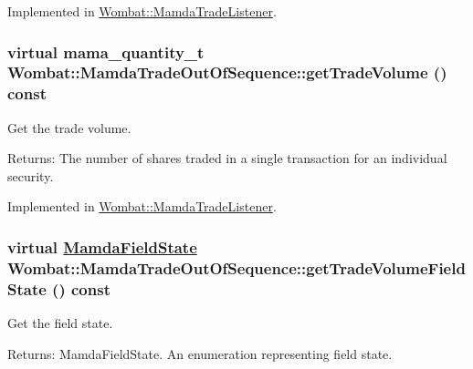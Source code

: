 Implemented in \hyperlink{classWombat_1_1MamdaTradeListener_f1dc31d1863ca41868f8b4a384c7ac46}{Wombat::Mamda\-Trade\-Listener}.\hypertarget{classWombat_1_1MamdaTradeOutOfSequence_6a7547c47304b1362c3f7df2a5529e2a}{
\subsubsection[getTradeVolume]{\setlength{\rightskip}{0pt plus 5cm}virtual mama\_\-quantity\_\-t Wombat::Mamda\-Trade\-Out\-Of\-Sequence::get\-Trade\-Volume () const}}
\label{classWombat_1_1MamdaTradeOutOfSequence_6a7547c47304b1362c3f7df2a5529e2a}


Get the trade volume. 

\begin{Desc}
\item[Returns:]The number of shares traded in a single transaction for an individual security. \end{Desc}


Implemented in \hyperlink{classWombat_1_1MamdaTradeListener_59830d5b7d9bf0df2e274f8f4ce49cc6}{Wombat::Mamda\-Trade\-Listener}.\hypertarget{classWombat_1_1MamdaTradeOutOfSequence_de62230d558877aa0a350b8842c1d5e1}{
\subsubsection[getTradeVolumeFieldState]{\setlength{\rightskip}{0pt plus 5cm}virtual \hyperlink{namespaceWombat_93aac974f2ab713554fd12a1fa3b7d2a}{Mamda\-Field\-State} Wombat::Mamda\-Trade\-Out\-Of\-Sequence::get\-Trade\-Volume\-Field\-State () const}}
\label{classWombat_1_1MamdaTradeOutOfSequence_de62230d558877aa0a350b8842c1d5e1}


Get the field state. 

\begin{Desc}
\item[Returns:]Mamda\-Field\-State. An enumeration representing field state. \end{Desc}


